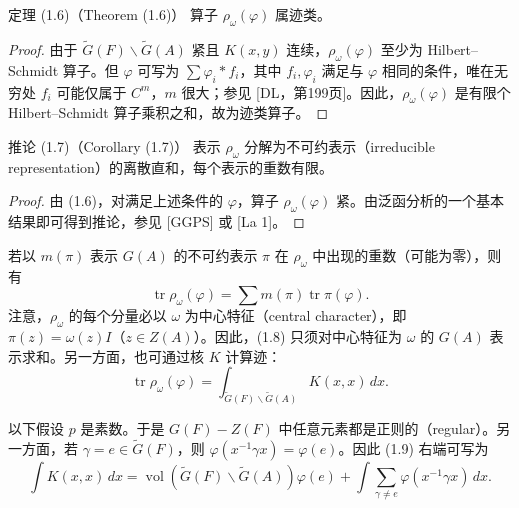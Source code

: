 \begin{originaltheorem}{定理 (1.6)（Theorem (1.6)）}
算子 $\rho_\omega(\varphi)$ 属迹类。
\end{originaltheorem}
\begin{proof}
由于 $\widetilde G(F)\backslash\widetilde G(A)$ 紧且 $K(x,y)$ 连续，$\rho_\omega(\varphi)$ 至少为 Hilbert--Schmidt 算子。但 $\varphi$ 可写为
$\sum\varphi_i*f_i$，其中 $f_i,\varphi_i$ 满足与 $\varphi$ 相同的条件，唯在无穷处 $f_i$ 可能仅属于 $C^m$，$m$ 很大；参见 [DL，第199页]。因此，$\rho_\omega(\varphi)$ 是有限个 Hilbert--Schmidt 算子乘积之和，故为迹类算子。
\end{proof}

\begin{originaltheorem}{推论 (1.7)（Corollary (1.7)）}
表示 $\rho_\omega$ 分解为不可约表示（irreducible representation）的离散直和，每个表示的重数有限。
\end{originaltheorem}
\begin{proof}
由 (1.6)，对满足上述条件的 $\varphi$，算子 $\rho_\omega(\varphi)$ 紧。由泛函分析的一个基本结果即可得到推论，参见 [GGPS] 或 [La 1]。
\end{proof}

若以 $m(\pi)$ 表示 $G(A)$ 的不可约表示 $\pi$ 在 $\rho_\omega$ 中出现的重数（可能为零），则有
\begin{equation}
 \operatorname{tr}\rho_\omega(\varphi)=\sum m(\pi)\operatorname{tr}\pi(\varphi).\tag{1.8}
\end{equation}
注意，$\rho_\omega$ 的每个分量必以 $\omega$ 为中心特征（central character），即
$\pi(z)=\omega(z)I$（$z\in Z(A)$）。因此，(1.8) 只须对中心特征为 $\omega$ 的 $G(A)$ 表示求和。另一方面，也可通过核 $K$ 计算迹：
\begin{equation}
 \operatorname{tr}\rho_\omega(\varphi)
 =\int_{\widetilde G(F)\backslash\widetilde G(A)}K(x,x)\,dx.\tag{1.9}
\end{equation}

以下假设 $p$ 是素数。于是 $G(F)-Z(F)$ 中任意元素都是正则的（regular）。另一方面，若
$\gamma=e\in\widetilde G(F)$，则 $\varphi(x^{-1}\gamma x)=\varphi(e)$。因此 (1.9) 右端可写为
\begin{equation}
 \int K(x,x)\,dx
 =\operatorname{vol}(\widetilde G(F)\backslash\widetilde G(A))\varphi(e)
 +\int\sum_{\gamma\ne e}\varphi(x^{-1}\gamma x)\,dx.\tag{1.10}
\end{equation}

